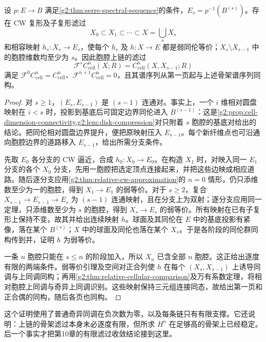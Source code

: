 \begin{lemma}\label{g2:lem:serre-filtered-cw-model}
	设 \(p:E\to B\) 满足\cref{g2:thm:serre-spectral-sequence}的条件，\(E_s=p^{-1}(B^{(s)})\)。存在 CW 复形及子复形滤过
	\[
		X_0\subset X_1\subset\cdots\subset X=\bigcup_sX_s
	\]
	和相容映射 \(h_s:X_s\to E_s\)，使每个 \(h_s\) 及 \(h:X\to E\) 都是弱同伦等价；\(X_s\setminus X_{s-1}\) 中的胞腔维数均至少为 \(s\)。因此胞腔上链的滤过
	\[
		\mathcal F^sC_{\mathrm{cell}}^n(X;R)=C_{\mathrm{cell}}^n(X,X_{s-1};R)
	\]
	满足 \(\mathcal F^0C_{\mathrm{cell}}^n=C_{\mathrm{cell}}^n\)、\(\mathcal F^{n+1}C_{\mathrm{cell}}^n=0\)，且其谱序列从第一页起与上述骨架谱序列同构。
\end{lemma}
\begin{proof}
	对 \(s\ge1\)，\((E_s,E_{s-1})\) 是 \((s-1)\) 连通对。事实上，一个 \(i\) 维相对圆盘映射在 \(i<s\) 时，投影到基底后可固定边界同伦进入 \(B^{(s-1)}\)：这是\cref{g2:prop:cell-dimension-connectivity,g2:lem:disk-compression}对只附着 \(s\) 胞腔的基底对给出的结论。把同伦相对圆盘边界提升，便把原映射压入 \(E_{s-1}\)。每个新纤维点也可沿通向胞腔边界的道路移入 \(E_{s-1}\)，给出所需分支条件。

	先取 \(E_0\) 各分支的 CW 逼近，合成 \(h_0:X_0\to E_0\)。在构造 \(X_1\) 时，对映入同一 \(E_1\) 分支的各个 \(X_0\) 分支，先用一胞腔把选定顶点连接起来，并把这些边映成相应道路。随后逐分支应用\cref{g2:thm:relative-cw-approximation}的 \(n=0\) 情形，仍只添维数至少为一的胞腔，得到 \(X_1\to E_1\) 的弱等价。对于 \(s\ge2\)，复合 \(X_{s-1}\to E_{s-1}\to E_s\) 为 \((s-1)\) 连通映射，且在分支上为双射；逐分支应用同一定理，只添维数至少为 \(s\) 的胞腔，得到 \(X_s\to E_s\) 的弱等价。所有映射在已有子复形上保持不变，故其并给出连续映射 \(h\)。球面及其同伦在 \(E\) 中的基底投影有紧像，落在某个 \(B^{(s)}\)；\(X\) 中的球面及同伦也落在某个 \(X_s\)。于是各阶段的同伦群同构传到并，证明 \(h\) 为弱等价。

	一条 \(n\) 胞腔只能在 \(s\le n\) 的阶段加入，所以 \(X_n\) 已含全部 \(n\) 胞腔。这正给出逐度有限的两端条件。弱等价引理及空间对正合列使 \(h\) 在每个 \((X_s,X_{s-1})\) 上诱导同调与上同调同构；再用\cref{g2:thm:relative-cellular-comparison}及万有系数定理，将相对胞腔上同调与奇异上同调识别。这些映射保持三元组连接同态，故给出第一页和正合偶的同构，随后各页也同构。
\end{proof}

这个证明使用了普通奇异同调在负次数为零，以及每条链只有有限支撑。它还说明：上链的骨架滤过本身未必逐度有限，但所求 \(H^n\) 在足够高的骨架上已经稳定。后一个事实才把第10章的有限滤过收敛结论接到这里。

\ProseParagraphBreak

